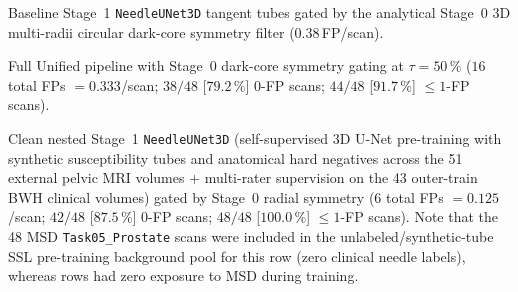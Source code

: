 \begin{table}[H]
\begin{threeparttable}
\begin{tablenotes}[flushleft]
\item[d] Baseline Stage~1 \texttt{NeedleUNet3D} tangent tubes gated by the analytical Stage~0 3D multi-radii circular dark-core symmetry filter ($0.38$\,FP/scan).
\item[e] Full Unified \NF{} pipeline with Stage~0 dark-core symmetry gating at $\tau=50\,\%$ ($16$ total FPs $= 0.333$/scan; $38/48$ [$79.2\,\%$] 0-FP scans; $44/48$ [$91.7\,\%$] $\le 1$-FP scans).
\item[f] Clean nested Stage~1 \texttt{NeedleUNet3D} (self-supervised 3D U-Net pre-training with synthetic susceptibility tubes and anatomical hard negatives across the 51 external pelvic MRI volumes + multi-rater supervision on the 43 outer-train BWH clinical volumes) gated by Stage~0 radial symmetry ($6$ total FPs $= 0.125$/scan; $42/48$ [$87.5\,\%$] 0-FP scans; $48/48$ [$100.0\,\%$] $\le 1$-FP scans). Note that the 48 MSD \texttt{Task05\_Prostate} scans were included in the unlabeled/synthetic-tube SSL pre-training background pool for this row (zero clinical needle labels), whereas rows  had zero exposure to MSD during training.
\end{tablenotes}
\end{threeparttable}
\end{table}
